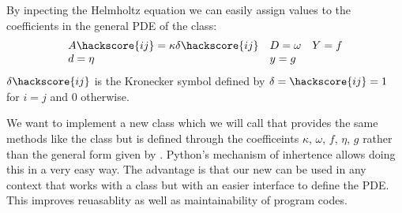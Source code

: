 By inpecting the Helmholtz equation  
we can easily assign values to the coefficients in the 
general PDE of the \LinearPDE class:
\begin{equation}\label{DIFFUSION HELM EQ 3}
\begin{array}{llllll}
A\hackscore{ij}=\kappa \delta\hackscore{ij} & D=\omega & Y=f \\
d=\eta & y= g &  \\
\end{array}
\end{equation}
$\delta\hackscore{ij}$ is the Kronecker symbol  defined by $\delta=\hackscore{ij}=1$ for
$i=j$ and $0$ otherwise.

We want to implement a 
new class which we will call  that provides the same methods like the \LinearPDE class but
is defined through the coefficeints $\kappa$, $\omega$, $f$, $\eta$, 
$g$ rather than the general form given by .
Python's
mechanism of inhertence allows doing this in a very easy way. 
The advantage is that our new  can be used in any context 
that works with a \LinearPDE class but with an easier interface to define the PDE.
This improves reuasablity as well as maintainability of program codes.

